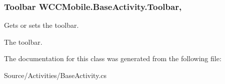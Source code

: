 \subsubsection[{\texorpdfstring{Toolbar}{Toolbar}}]{\setlength{\rightskip}{0pt plus 5cm}Toolbar W\+C\+C\+Mobile.\+Base\+Activity.\+Toolbar\hspace{0.3cm}{\ttfamily [get]}, {\ttfamily [set]}}\hypertarget{class_w_c_c_mobile_1_1_base_activity_a2a28b22e5e08da4a6a10debd119a9c97}{}\label{class_w_c_c_mobile_1_1_base_activity_a2a28b22e5e08da4a6a10debd119a9c97}


Gets or sets the toolbar. 

The toolbar. 

The documentation for this class was generated from the following file\+:\begin{DoxyCompactItemize}
\item 
Source/\+Activities/Base\+Activity.\+cs\end{DoxyCompactItemize}
